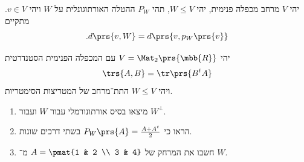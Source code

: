 \documentclass[a4paper,10pt,twoside,openany]{book}
\begin{document}
\begin{theorem}
יהי
$V$
מרחב מכפלה פנימית, יהי
$W \leq V$,
תהי
$P_W$
ההטלה האורתוגונלית על
$W$
ויהי
$v \in V$.
מתקיים
\[\text{.} d\prs{v,W} = d\prs{v, p_W\prs{v}}\]
\end{theorem}

\begin{exercisechap}
יהי
$V = \Mat_2\prs{\mbb{R}}$
עם המכפלה הפנימית הסטנדרטית
\[\trs{A,B} = \tr\prs{B^t A}\]
ויהי
$W \leq V$
התת־מרחב של המטריצות הסימטריות.

\begin{enumerate}
\item מיצאו בסיס אורתונורמלי עבור
$W$
ועבור
$W^\perp$.

\item
הראו כי
$P_W\prs{A} = \frac{A + A^t}{2}$
בשתי דרכים שונות.

\item
חשבו את המרחק של
$A = \pmat{1 & 2 \\ 3 & 4}$
מ־%
$W$.
\end{enumerate}
\end{exercisechap}
\end{document}
